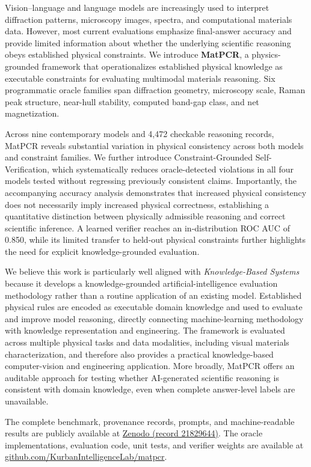 \documentclass[10pt,a4paper]{article}
\begin{document}
Vision--language and language models are increasingly used to interpret
diffraction patterns, microscopy images, spectra, and computational materials
data. However, most current evaluations emphasize final-answer accuracy and
provide limited information about whether the underlying scientific reasoning
obeys established physical constraints. We introduce \textbf{MatPCR}, a
physics-grounded framework that operationalizes established physical knowledge
as executable constraints for evaluating multimodal materials reasoning. Six
programmatic oracle families span diffraction geometry, microscopy scale, Raman
peak structure, near-hull stability, computed band-gap class, and net
magnetization.

Across nine contemporary models and 4,472 checkable reasoning records, MatPCR
reveals substantial variation in physical consistency across both models and
constraint families. We further introduce Constraint-Grounded
Self-Verification, which systematically reduces oracle-detected violations in
all four models tested without regressing previously consistent claims.
Importantly, the accompanying accuracy analysis demonstrates that increased
physical consistency does not necessarily imply increased physical correctness,
establishing a quantitative distinction between physically admissible reasoning
and correct scientific inference. A learned verifier reaches an in-distribution
ROC AUC of 0.850, while its limited transfer to held-out physical constraints
further highlights the need for explicit knowledge-grounded evaluation.

We believe this work is particularly well aligned with
\textit{Knowledge-Based Systems} because it develops a knowledge-grounded
artificial-intelligence evaluation methodology rather than a routine application
of an existing model. Established physical rules are encoded as executable
domain knowledge and used to evaluate and improve model reasoning, directly
connecting machine-learning methodology with knowledge representation and
engineering. The framework is evaluated across multiple physical tasks and data
modalities, including visual materials characterization, and therefore also
provides a practical knowledge-based computer-vision and engineering
application. More broadly, MatPCR offers an auditable approach for testing
whether AI-generated scientific reasoning is consistent with domain knowledge,
even when complete answer-level labels are unavailable.

The complete benchmark, provenance records, prompts, and machine-readable
results are publicly available at
\href{https://zenodo.org/records/21829644}
{Zenodo (record 21829644)}.
The oracle implementations, evaluation code, unit tests, and verifier weights
are available at
\href{https://github.com/KurbanIntelligenceLab/matpcr}
{github.com/KurbanIntelligenceLab/matpcr}.
\end{document}
